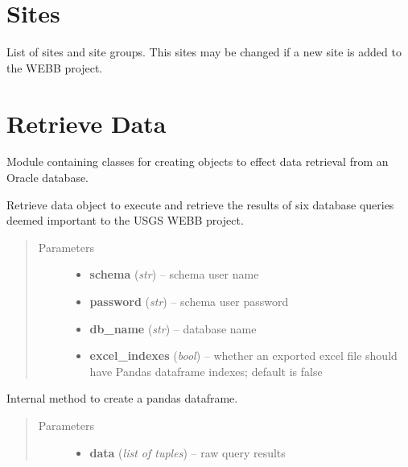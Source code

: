 \documentclass[letterpaper,10pt,english]{sphinxmanual}
\begin{document}
\section{Sites}
\label{modules:sites}
List of sites and site groups. This sites may be changed
if a new site is added to the WEBB project.


\section{Retrieve Data}
\label{modules:retrieve-data}
Module containing classes for creating objects to
effect data retrieval from an Oracle database.

\begin{fulllineitems}
\label{modules:webb_utils.retrieve_data.RetrieveData}
Retrieve data object to execute and retrieve the results
of six database queries deemed important to the USGS WEBB
project.
\begin{quote}\begin{description}
\item[{Parameters}] \leavevmode\begin{itemize}
\item {} 
\textbf{schema} (\emph{str}) -- schema user name

\item {} 
\textbf{password} (\emph{str}) -- schema user password

\item {} 
\textbf{db\_name} (\emph{str}) -- database name

\item {} 
\textbf{excel\_indexes} (\emph{bool}) -- whether an exported excel file should have Pandas dataframe indexes; default is false

\end{itemize}

\end{description}\end{quote}

\begin{fulllineitems}
\label{modules:webb_utils.retrieve_data.RetrieveData._create_dataframe}
Internal method to create a pandas dataframe.
\begin{quote}\begin{description}
\item[{Parameters}] \leavevmode\begin{itemize}
\item {} 
\textbf{data} (\emph{list of tuples}) -- raw query results


\end{itemize}
\end{description}
\end{quote}
\end{fulllineitems}
\end{fulllineitems}
\end{document}
